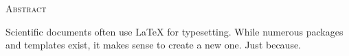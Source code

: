 
\begin{center}
  \textsc{Abstract}
\end{center}
%
\noindent
%
Scientific documents often use \LaTeX{} for typesetting. While numerous
packages and templates exist, it makes sense to create a new one. Just
because.
